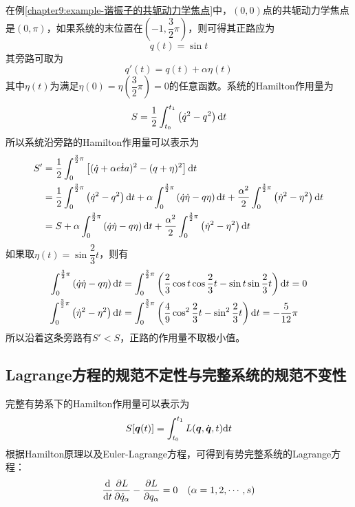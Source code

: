 \begin{example}
在例\ref{chapter9:example-谐振子的共轭动力学焦点}中，$(0,0)$点的共轭动力学焦点是$(0,\pi)$，如果系统的末位置在$\left(-1,\dfrac32\pi\right)$，则可得其正路应为
\begin{equation*}
	q(t) = \sin t
\end{equation*}
其旁路可取为
\begin{equation*}
	q'(t) = q(t)+\alpha \eta(t)
\end{equation*}
其中$\eta(t)$为满足$\eta(0)=\eta\left(\dfrac32\pi\right)=0$的任意函数。系统的Hamilton作用量为
\begin{equation*}
	S = \frac12 \int_{t_0}^{t_1} \left(\dot{q}^2-q^2\right)\mathrm{d} t
\end{equation*}
所以系统沿旁路的Hamilton作用量可以表示为
\begin{align*}
	S' & = \frac12 \int_0^{\frac32\pi}\left[(\dot{q}+\alpha\dot{eta})^2 - (q+\eta)^2 \right] \mathrm{d} t \\
	& = \frac12 \int_0^{\frac32\pi}\left(\dot{q}^2 - q^2 \right)\mathrm{d} t + \alpha \int_0^{\frac32\pi}\left(\dot{q}\dot{\eta}-q\eta\right) \mathrm{d} t + \dfrac{\alpha^2}{2} \int_0^{\frac32\pi}\left(\dot{\eta}^2-\eta^2\right)\mathrm{d} t \\
	& = S + \alpha \int_0^{\frac32\pi}\left(\dot{q}\dot{\eta}-q\eta\right) \mathrm{d} t + \dfrac{\alpha^2}{2} \int_0^{\frac32\pi}\left(\dot{\eta}^2-\eta^2\right)\mathrm{d} t
\end{align*}
如果取$\eta(t) = \sin \dfrac23t$，则有
\begin{align*}
	\int_0^{\frac32\pi}\left(\dot{q}\dot{\eta}-q\eta\right) \mathrm{d} t & = \int_0^{\frac32\pi}\left(\frac23\cos t\cos \frac23t - \sin t\sin \frac23t\right) \mathrm{d} t = 0 \\
	\int_0^{\frac32\pi}\left(\dot{\eta}^2-\eta^2\right)\mathrm{d} t & = \int_0^{\frac32\pi}\left(\frac49\cos^2 \frac23t - \sin^2 \frac23t\right) \mathrm{d} t = -\frac{5}{12}\pi
\end{align*}
所以沿着这条旁路有$S'<S$，正路的作用量不取极小值。
\end{example}

\subsection{Lagrange方程的规范不定性与完整系统的规范不变性}

完整有势系下的Hamilton作用量可以表示为
\begin{equation}
	S[\boldsymbol{q}(t)] = \int_{t_0}^{t_1} L(\boldsymbol{q},\dot{\boldsymbol{q}},t) \mathrm{d} t
\end{equation}
根据Hamilton原理以及Euler-Lagrange方程，可得到有势完整系统的Lagrange方程：
\begin{equation}
	\frac{\mathrm{d}}{\mathrm{d} t} \frac{\partial L}{\partial \dot{q}_\alpha} - \frac{\partial L}{\partial q_\alpha} = 0 \quad (\alpha = 1,2,\cdots,s)
\end{equation}

